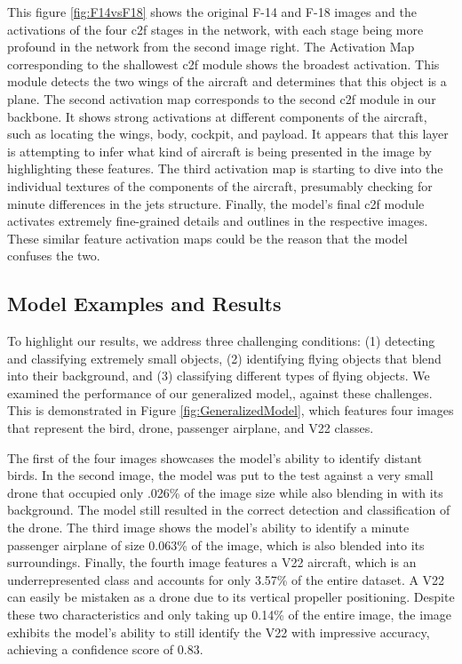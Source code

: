 \documentclass[10pt,twocolumn,letterpaper]{article}
\begin{document}
This figure \ref{fig:F14vsF18} shows the original F-14 and F-18 images and the activations of the four c2f stages in the network, with each stage being more profound in the network from the second image right. The Activation Map corresponding to the shallowest c2f module shows the broadest activation. This module detects the two wings of the aircraft and determines that this object is a plane. The second activation map corresponds to the second c2f module in our backbone. It shows strong activations at different components of the aircraft, such as locating the wings, body, cockpit, and payload. It appears that this layer is attempting to infer what kind of aircraft is being presented in the image by highlighting these features. The third activation map is starting to dive into the individual textures of the components of the aircraft, presumably checking for minute differences in the jets structure. Finally, the model's final c2f module activates extremely fine-grained details and outlines in the respective images.  These similar feature activation maps could be the reason that the model confuses the two.

\subsection{Model Examples and Results}
To highlight our results, we address three challenging conditions: (1) detecting and classifying extremely small objects, (2) identifying flying objects that blend into their background, and (3) classifying different types of flying objects. We examined the performance of our generalized model,\cite{InitialDataset}, against these challenges. This is demonstrated in Figure \ref{fig:GeneralizedModel}, which features four images that represent the bird, drone, passenger airplane, and V22 classes.

The first of the four images showcases the model's ability to identify distant birds. In the second image, the model was put to the test against a very small drone that occupied only .026\% of the image size while also blending in with its background. The model still resulted in the correct detection and classification of the drone. The third image shows the model's ability to identify a minute passenger airplane of size 0.063\% of the image, which is also blended into its surroundings. Finally, the fourth image features a V22 aircraft, which is an underrepresented class and accounts for only 3.57\% of the entire dataset. A V22 can easily be mistaken as a drone due to its vertical propeller positioning. Despite these two characteristics and only taking up 0.14\% of the entire image, the image exhibits the model's ability to still identify the V22 with impressive accuracy, achieving a confidence score of 0.83.
\end{document}
